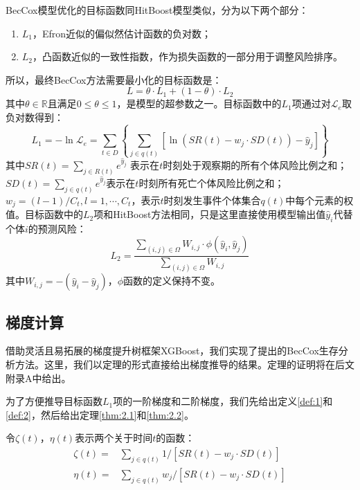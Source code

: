 BecCox模型优化的目标函数同HitBoost模型类似，分为以下两个部分：
\begin{enumerate}
	\item $L_1$，Efron近似的偏似然估计函数的负对数；
	\item $L_2$，凸函数近似的一致性指数，作为损失函数的一部分用于调整风险排序。
\end{enumerate}
所以，最终BecCox方法需要最小化的目标函数是：
\begin{equation}
L = \theta \cdot L_1 + (1- \theta) \cdot L_2
\end{equation}
其中$\theta \in \mathbb{R}$且满足$0 \le \theta \le 1$，是模型的超参数之一。目标函数中的$L_1$项通过对$\mathcal{L}_e$取负对数得到：
\begin{equation}
L_1 = -\ln\mathcal{L}_e = \sum_{t\in D} \left\{ \sum_{j\in q(t)} [\ln(SR(t)-w_j\cdot SD(t))-\hat{y}_j] \right\}
\end{equation}
其中$SR(t)=\sum_{j\in R(t)} e^{\hat{y}_j}$ 表示在$t$时刻处于观察期的所有个体风险比例之和；$SD(t)=\sum_{j\in q(t)} e^{\hat{y}_j}$表示在$t$时刻所有死亡个体风险比例之和；$w_j=(l-1)/C_t, l=1,\cdots,C_t$，表示$t$时刻发生事件个体集合$q(t)$中每个元素的权值。目标函数中的$L_2$项和HitBoost方法相同，只是这里直接使用模型输出值$\hat{y}_i$代替个体$i$的预测风险：
\begin{equation}
L_2 = \frac{\sum_{(i,j)\in \Omega} W_{i,j}\cdot \phi(\hat{y}_i, \hat{y}_j)}{\sum_{(i,j)\in \Omega} W_{i,j}}
\end{equation}
其中$W_{i,j}=-(\hat{y}_i-\hat{y}_j)$，$\phi$函数的定义保持不变。

\subsection{梯度计算}

借助灵活且易拓展的梯度提升树框架XGBoost，我们实现了提出的BecCox生存分析方法。这里，我们以定理的形式直接给出梯度推导的结果。定理的证明将在后文附录A中给出。
    
为了方便推导目标函数$L_1$项的一阶梯度和二阶梯度，我们先给出定义\ref{def:1}和\ref{def:2}，然后给出定理\ref{thm:2.1}和\ref{thm:2.2}。

\begin{definition}\label{def:1}
令$\zeta(t)$，$\eta(t)$表示两个关于时间$t$的函数：\[
\begin{split}
\zeta(t) =& \sum_{j\in q(t)} 1/[SR(t) - w_j\cdot SD(t)] \\
\eta(t)  =& \sum_{j\in q(t)} w_j/[SR(t) - w_j\cdot SD(t)]
\end{split}
\]
\end{definition}

